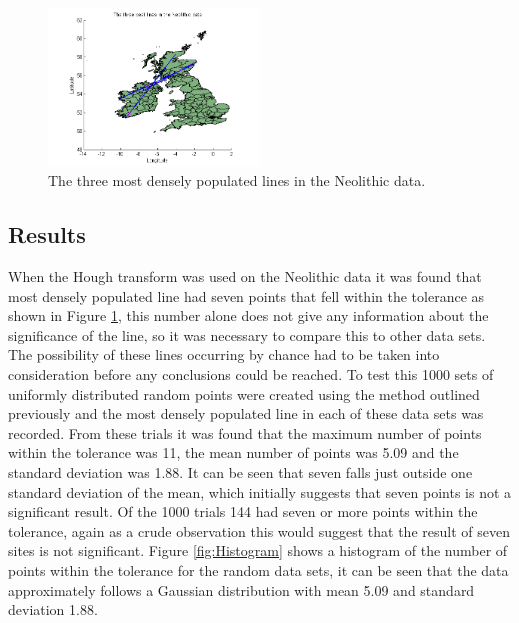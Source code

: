 \documentclass[a4paper]{article}
\begin{document}
\begin{figure}[H]
\centering
\includegraphics[width=0.5\textwidth]{Best_Line_Sites_3.png}
\caption{\label{fig:Line}The three most densely populated lines in the Neolithic data.}
\end{figure}


\subsection{Results}
When the Hough transform was used on the Neolithic data it was found that most densely populated line had seven points that fell within the tolerance as shown in Figure \ref{fig:Line}, this number alone does not give any information about the significance of the line, so it was necessary to compare this to other data sets. The possibility of these lines occurring by chance had to be taken into consideration before any conclusions could be reached. 
\newline\newline
To test this 1000 sets of uniformly distributed random points were created using the method outlined previously and the most densely populated line in each of these data sets was recorded. From these trials it was found that the maximum number of points within the tolerance was 11, the mean number of points was 5.09 and the standard deviation was 1.88. It can be seen that seven falls just outside one standard deviation of the mean, which initially suggests that seven points is not a significant result. Of the 1000 trials 144 had seven or more points within the tolerance, again as a crude observation this would suggest that the result of seven sites is not significant.
\newline\newline
Figure \ref{fig:Histogram} shows a histogram of the number of points within the tolerance for the random data sets, it can be seen that the data approximately follows a Gaussian distribution with mean 5.09 and standard deviation 1.88. 
\newline\newline
\end{document}
